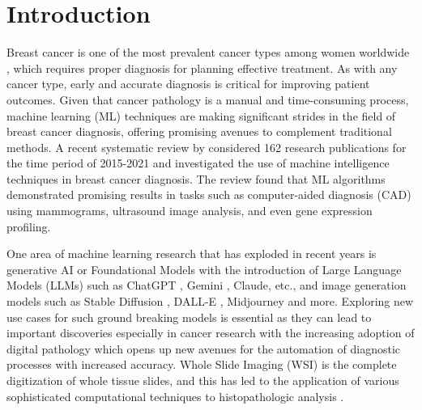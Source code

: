 

\chapter{Introduction}

\ifpdf
    \graphicspath{{1_introduction/figures/PNG/}{1_introduction/figures/PDF/}{1_introduction/figures/}}
\else
    \graphicspath{{1_introduction/figures/EPS/}{1_introduction/figures/}}
\fi


Breast cancer is one of the most prevalent cancer types among women worldwide \parencite{Sung2021GlobalCountries}, which requires proper diagnosis for planning effective treatment. As with any cancer type, early and accurate diagnosis is critical for improving patient outcomes. Given that cancer pathology is a manual and time-consuming process, machine learning (ML) techniques are making significant strides in the field of breast cancer diagnosis, offering promising avenues to complement traditional methods. A recent systematic review by \textcite{Nemade2022ATechniques} considered 162 research publications for the time period of 2015-2021 and investigated the use of machine intelligence techniques in breast cancer diagnosis. The review found that ML algorithms demonstrated promising results in tasks such as computer-aided diagnosis (CAD) using mammograms, ultrasound image analysis, and even gene expression profiling. 

One area of machine learning research that has exploded in recent years is generative AI or Foundational Models \parencite{Bommasani2021OnModels} with the introduction of Large Language Models (LLMs) such as ChatGPT \parencite{Brown2020LanguageLearners} \parencite{OpenAI2023GPT-4Report}, Gemini \parencite{GeminiTeam2023Gemini:Models}, Claude, etc., and image generation models such as Stable Diffusion \parencite{Rombach2021High-ResolutionModels}, DALL-E \parencite{Ramesh2021Zero-ShotGeneration}, Midjourney and more. Exploring new use cases for such ground breaking models is essential as they can lead to important discoveries especially in cancer research with the increasing adoption of digital pathology which opens up new avenues for the automation of diagnostic processes with increased accuracy. Whole Slide Imaging (WSI) is the complete digitization of whole tissue slides, and this has led to the application of various sophisticated computational techniques to histopathologic analysis \parencite{Aeffner2019IntroductionAssociation.} \parencite{Madabhushi2016ImageOpportunities.}.

